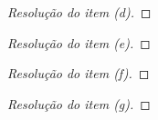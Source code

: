 \begin{proof}[Resolução do item (d)]

\end{proof}
\begin{proof}[Resolução do item (e)]

\end{proof}
\begin{proof}[Resolução do item (f)]

\end{proof}
\begin{proof}[Resolução do item (g)]

\end{proof}

